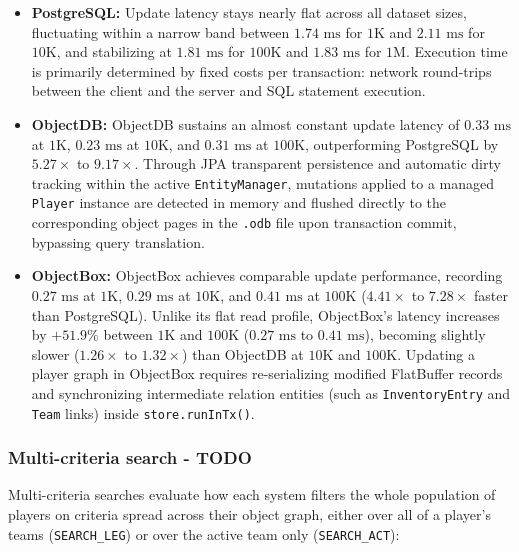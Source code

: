 \documentclass{article}
\begin{document}
\begin{itemize}
    \item \textbf{PostgreSQL:} Update latency stays nearly flat across all dataset sizes, fluctuating within a narrow band between $1.74\text{ ms}$  for $1\text{K}$ and $2.11\text{ ms}$ for $10\text{K}$, and stabilizing at $1.81\text{ ms}$ for $100\text{K}$ and $1.83\text{ ms}$ for $1\text{M}$. Execution time is primarily determined by fixed costs per transaction: network round-trips between the client and the server and SQL statement execution.

    \item \textbf{ObjectDB:} ObjectDB sustains an almost constant update latency of $0.33\text{ ms}$ at $1\text{K}$, $0.23\text{ ms}$ at $10\text{K}$, and $0.31\text{ ms}$ at $100\text{K}$, outperforming PostgreSQL by $5.27\times$ to $9.17\times$. Through JPA transparent persistence and automatic dirty tracking within the active \texttt{EntityManager}, mutations applied to a managed \texttt{Player} instance are detected in memory and flushed directly to the corresponding object pages in the \texttt{.odb} file upon transaction commit, bypassing query translation.

    \item \textbf{ObjectBox:} ObjectBox achieves comparable update performance, recording $0.27\text{ ms}$ at $1\text{K}$, $0.29\text{ ms}$ at $10\text{K}$, and $0.41\text{ ms}$ at $100\text{K}$ ($4.41\times$ to $7.28\times$ faster than PostgreSQL). Unlike its flat read profile, ObjectBox's latency increases by $+51.9\%$ between $1\text{K}$ and $100\text{K}$ ($0.27\text{ ms}$ to $0.41\text{ ms}$), becoming slightly slower ($1.26\times$ to $1.32\times$) than ObjectDB at $10\text{K}$ and $100\text{K}$. Updating a player graph in ObjectBox requires re-serializing modified FlatBuffer records and synchronizing intermediate relation entities (such as \texttt{InventoryEntry} and \texttt{Team} links) inside \texttt{store.runInTx()}.
\end{itemize}

\subsubsection{Multi-criteria search - TODO}
Multi-criteria searches evaluate how each system filters the whole population of players on criteria spread across their object graph, either over all of a player's teams (\texttt{SEARCH\_LEG}) or over the active team only (\texttt{SEARCH\_ACT}):
\end{document}
